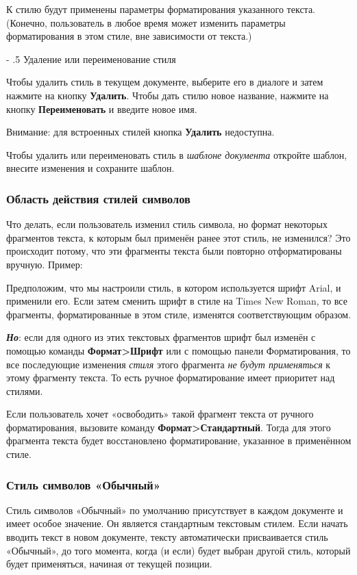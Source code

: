﻿\documentclass[a4paper,10pt]{article}
\makeatletter
\renewcommand\paragraph{%
   \@startsection{paragraph}{4}{0mm}%
      {-\baselineskip}%
      {.5\baselineskip}%
      {\normalfont\normalsize\bfseries}}
\makeatother
\begin{document}
К стилю будут применены параметры форматирования указанного текста. (Конечно, пользователь в любое время может изменить параметры форматирования в этом стиле, вне зависимости от текста.)

\paragraph{Удаление или переименование стиля}

Чтобы удалить стиль в текущем документе, выберите его в диалоге и затем нажмите на кнопку \textbf{Удалить}. Чтобы дать стилю новое название, нажмите на кнопку \textbf{Переименовать} и введите новое имя.

Внимание: для встроенных стилей кнопка \textbf{Удалить} недоступна.

Чтобы удалить или  переименовать стиль в \textit{шаблоне документа} откройте шаблон, внесите изменения и сохраните шаблон.

\subsubsection{Область действия стилей символов}
Что делать, если пользователь изменил стиль символа, но формат некоторых фрагментов текста, к которым был применён ранее этот стиль, не изменился? Это происходит потому, что эти фрагменты текста были повторно отформатированы вручную. Пример:

Предположим, что мы настроили стиль, в котором используется шрифт Arial, и применили его. Если затем сменить шрифт в стиле на Times New Roman, то все фрагменты, форматированные в этом стиле, изменятся соответствующим образом.

\textbf{\textit{Но}}: если для одного из этих текстовых фрагментов шрифт был изменён с помощью команды \textbf{Формат>Шрифт} или с помощью панели Форматирования, то все последующие изменения \textit{стиля} этого фрагмента \textit{не будут применяться} к этому фрагменту текста. То есть ручное форматирование имеет приоритет над стилями.

Если пользователь хочет «освободить» такой фрагмент текста от ручного форматирования, вызовите команду \textbf{Формат>Стандартный}. Тогда для этого фрагмента текста будет восстановлено форматирование, указанное в применённом стиле.

\subsubsection{Стиль символов «Обычный»} \label{sec:стильсимволовобычный}
Стиль символов «Обычный» по умолчанию присутствует в каждом документе и имеет особое значение. Он является стандартным текстовым стилем. Если начать вводить текст в новом документе, тексту автоматически присваивается стиль «Обычный», до того момента, когда (и если) будет выбран другой стиль, который будет применяться, начиная от текущей позиции.
\end{document}
